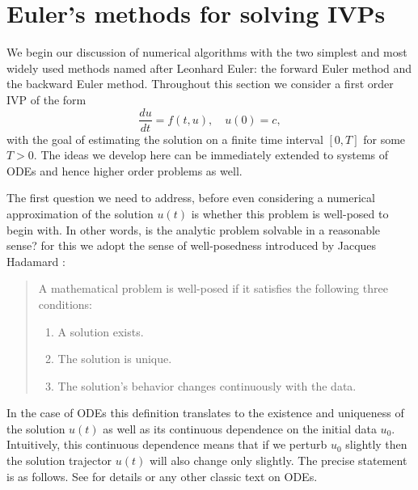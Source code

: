 \chapter{Euler's methods for solving IVPs}

We begin our discussion of numerical algorithms with the 
two simplest and most widely used methods named after 
Leonhard Euler: the forward Euler method and the backward Euler 
method. Throughout this section we consider a first order 
IVP of the form
\begin{equation*}\label{eq:scalar-ivp-lec3}
    \frac{du}{dt} = f(t, u), 
\quad u(0) = c,
\end{equation*}
with the goal of estimating the solution on a finite 
time interval $[0, T]$ for some $T > 0$. The ideas we develop 
here can be immediately extended to systems of ODEs and 
hence higher order problems as well. 

The first question we need to address, before even considering 
a numerical approximation of the solution $u(t)$ is 
whether this problem is well-posed to begin with. In other words, 
is the analytic problem solvable in a reasonable sense? for this 
we adopt the sense of well-posedness introduced by 
Jacques Hadamard \cite[Ch.~1]{higham2015princeton}: 

\begin{quote}
    A mathematical problem is well-posed if it satisfies the following three conditions:
    \begin{enumerate}
        \item A solution exists.
        \item The solution is unique.
        \item The solution's behavior changes continuously 
        with the data.
    \end{enumerate}
\end{quote}

In the case of ODEs this definition translates to the 
existence and uniqueness of the solution $u(t)$ as well as 
its continuous dependence on the initial data $u_0$. Intuitively,
this continuous dependence means that if we perturb $u_0$ 
slightly then the solution trajector $u(t)$ will also 
change only slightly. The precise statement is as follows. See 
\cite[Sec.~2.2 and 2.3]{perko2013differential} for details or 
any other classic text on ODEs.

